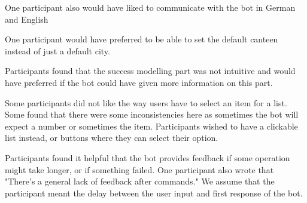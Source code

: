One participant also would have liked to communicate with the bot in German and English

One participant would have preferred to be able to set the default canteen instead of just a default city. 

Participants found that the success modelling part was not intuitive and would have preferred if the bot could have given more information on this part. 

Some participants did not like the way users have to select an item for a list. Some found that there were some inconsistencies here as sometimes the bot will expect a number or sometimes the item. 
Participants wished to have a clickable list instead, or buttons where they can select their option.

Participants found it helpful that the bot provides feedback if some operation might take longer, or if something failed. One participant also wrote that "There's a general lack of feedback after commands." We assume that the participant meant the delay between the user input and first response of the bot.  
